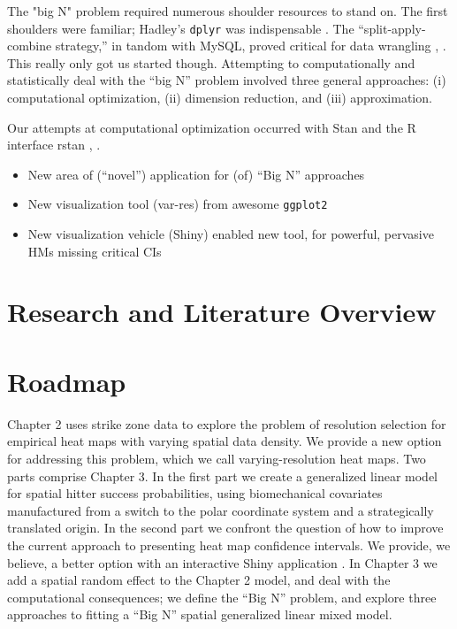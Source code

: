 The "big N" problem required numerous shoulder resources to stand on. The first shoulders were familiar; Hadley's \verb|dplyr| was indispensable \citep{Wickham2016}. The ``split-apply-combine strategy,'' in tandom with MySQL, proved critical for data wrangling \citep{Wickham2016}, \citep{Tahaghoghi2006}. This really only got us started though. Attempting to computationally and statistically deal with the ``big N'' problem involved three general approaches: (i) computational optimization, (ii) dimension reduction, and (iii) approximation.

Our attempts at computational optimization occurred with Stan and the R interface rstan \citep{rstan}, \citep{STANtheMan}.


\begin{itemize}
\item New area of (``novel'') application for (of) ``Big N'' approaches
\item New visualization tool (var-res) from awesome \verb|ggplot2|
\item New visualization vehicle (Shiny) enabled new tool, for powerful, pervasive HMs missing critical CIs
\end{itemize}


\section{Research and Literature Overview}

\section{Roadmap}


Chapter 2 uses strike zone data to explore the problem of resolution selection for empirical heat maps with varying spatial data density. We provide a new option for addressing this problem, which we call varying-resolution heat maps. Two parts comprise Chapter 3. In the first part we create a generalized linear model for spatial hitter success probabilities, using biomechanical covariates manufactured from a switch to the polar coordinate system and a strategically translated origin. In the second part we confront the question of how to improve the current approach to presenting heat map confidence intervals. We provide, we believe, a better option with an interactive Shiny application \citep{Shiny}. In Chapter 3 we add a spatial random effect to the Chapter 2 model, and deal with the computational consequences; we define the ``Big N'' problem, and explore three approaches to fitting a ``Big N'' spatial generalized linear mixed model. 
